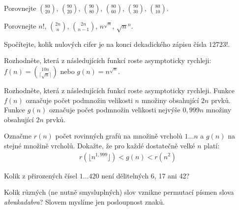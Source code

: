 \begin{t_exercise}
  \item Porovnejte $\binom{80}{20}$, $\binom{90}{20}$, $\binom{90}{80}$, $\binom{80}{60}$, $\binom{90}{30}$, $\binom{80}{10}$.
  \item Porovnejte $n!$, $\binom{2n}{n}$, $\binom{2n}{n-1}$, $n^{\sqrt{n}}$, $\sqrt{n}^n$.
  \item Spočítejte, kolik nulových cifer je na konci dekadického zápisu čísla $12723!$.
  \item Rozhodněte, která z následujících funkcí roste asymptoticky rychleji:
  \\$f(n)=\binom{10n}{\lceil\sqrt{n}\rceil}$ nebo $g(n)=n^\sqrt{n}$.
  \item Rozhodněte, která z následujících funkcí roste asymptoticky rychleji. Funkce $f(n)$ označuje počet podmnožin velikosti $n$ množiny obsahující $2n$ prvků. Funkce $g(n)$ označuje počet podmnožin velikosti nejvýše $0,999n$ množiny obsahující $2n$ prvků.
  \item Označme $r(n)$ počet rovinných grafů na množině vrcholů $1\dots n$ a $g(n)$ na stejné množině vrcholů. Dokažte, že pro každé dostatečně velké $n$ platí:
  \begin{align*}
    r(\lfloor n^{1,999} \rfloor)<g(n)<r(n^2)
  \end{align*}
  \item Kolik z přirozených čísel $1\dots 420$ není dělitelných 6, 17 ani 42?
  \item Kolik různých (ne nutně smysluplných) slov vznikne permutací písmen slova \textit{abrakadabra}? Slovem myslíme jen posloupnost znaků.
\end{t_exercise}